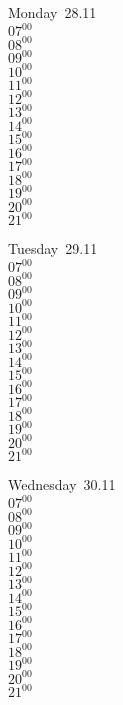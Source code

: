 \documentclass[11pt,a4paper]{book}\usepackage[]{graphicx}\usepackage[]{color}
\begin{document}
\begin{headerbox}
\end{headerbox}
\begin{weekdaybox}
  Monday~28.11\\
  { 
  \vfill
  $07^{00}$\\
$08^{00}$\\
$09^{00}$\\
$10^{00}$\\
$11^{00}$\\
$12^{00}$\\
$13^{00}$\\
$14^{00}$\\
$15^{00}$\\
$16^{00}$\\
$17^{00}$\\
$18^{00}$\\
$19^{00}$\\
$20^{00}$\\
$21^{00}$\\
  }
\end{weekdaybox}
\begin{weekdaybox}
  Tuesday~29.11\\
  { 
  \vfill
  $07^{00}$\\
$08^{00}$\\
$09^{00}$\\
$10^{00}$\\
$11^{00}$\\
$12^{00}$\\
$13^{00}$\\
$14^{00}$\\
$15^{00}$\\
$16^{00}$\\
$17^{00}$\\
$18^{00}$\\
$19^{00}$\\
$20^{00}$\\
$21^{00}$\\
  }
\end{weekdaybox}
\begin{weekdaybox}
  Wednesday~30.11\\
  { 
  \vfill
  $07^{00}$\\
$08^{00}$\\
$09^{00}$\\
$10^{00}$\\
$11^{00}$\\
$12^{00}$\\
$13^{00}$\\
$14^{00}$\\
$15^{00}$\\
$16^{00}$\\
$17^{00}$\\
$18^{00}$\\
$19^{00}$\\
$20^{00}$\\
$21^{00}$\\
  }
\end{weekdaybox}
\end{document}
